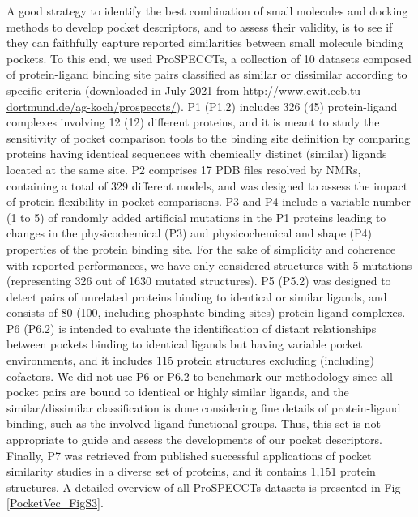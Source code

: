 A good strategy to identify the best combination of small molecules and docking methods to develop pocket descriptors, and to assess their validity, is to see if they can faithfully capture reported similarities between small molecule binding pockets. To this end, we used ProSPECCTs\cite{ehrt_benchmark_2018}, a collection of 10 datasets composed of protein-ligand binding site pairs classified as similar or dissimilar according to specific criteria (downloaded in July 2021 from \hyperlink{http://www.ewit.ccb.tu-dortmund.de/ag-koch/prospeccts/}{http://www.ewit.ccb.tu-dortmund.de/ag-koch/prospeccts/}). P1 (P1.2) includes 326 (45) protein-ligand complexes involving 12 (12) different proteins, and it is meant to study the sensitivity of pocket comparison tools to the binding site definition by comparing proteins having identical sequences with chemically distinct (similar) ligands located at the same site. P2 comprises 17 PDB files resolved by NMRs, containing a total of 329 different models, and was designed to assess the impact of protein flexibility in pocket comparisons. P3 and P4 include a variable number (1 to 5) of randomly added artificial mutations in the P1 proteins leading to changes in the physicochemical (P3) and physicochemical and shape (P4) properties of the protein binding site. For the sake of simplicity and coherence with reported performances, we have only considered structures with 5 mutations (representing 326 out of 1630 mutated structures). P5 (P5.2) was designed to detect pairs of unrelated proteins binding to identical or similar ligands, and consists of 80 (100, including phosphate binding sites) protein-ligand complexes\cite{kahraman_shape_2007}. P6 (P6.2) is intended to evaluate the identification of distant relationships between pockets binding to identical ligands but having variable pocket environments\cite{barelier_recognition_2015}, and it includes 115 protein structures excluding (including) cofactors. We did not use P6 or P6.2 to benchmark our methodology since all pocket pairs are bound to identical or highly similar ligands, and the similar/dissimilar classification is done considering fine details of protein-ligand binding, such as the involved ligand functional groups. Thus, this set is not appropriate to guide and assess the developments of our pocket descriptors. Finally, P7 was retrieved from published successful applications of pocket similarity studies in a diverse set of proteins, and it contains 1,151 protein structures. A detailed overview of all ProSPECCTs datasets is presented in Fig \ref{PocketVec_FigS3}.

